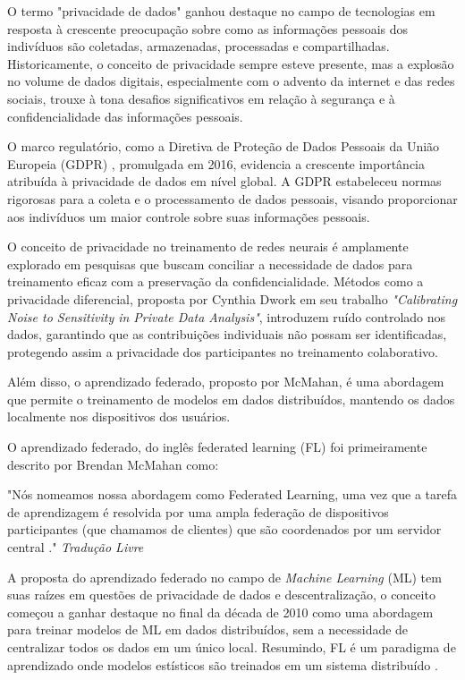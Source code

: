 O termo "privacidade de dados" ganhou destaque no campo de tecnologias em resposta à crescente preocupação sobre como as informações pessoais dos indivíduos são coletadas, armazenadas, processadas e compartilhadas. Historicamente, o conceito de privacidade sempre esteve presente, mas a explosão no volume de dados digitais, especialmente com o advento da internet e das redes sociais, trouxe à tona desafios significativos em relação à segurança e à confidencialidade das informações pessoais.

O marco regulatório, como a Diretiva de Proteção de Dados Pessoais da União Europeia (GDPR) \cite{GDPR}, promulgada em 2016, evidencia a crescente importância atribuída à privacidade de dados em nível global. A GDPR estabeleceu normas rigorosas para a coleta e o processamento de dados pessoais, visando proporcionar aos indivíduos um maior controle sobre suas informações pessoais.

O conceito de privacidade no treinamento de redes neurais é amplamente explorado em pesquisas que buscam conciliar a necessidade de dados para treinamento eficaz com a preservação da confidencialidade. Métodos como a privacidade diferencial, proposta por Cynthia Dwork em seu trabalho \textit{"Calibrating Noise to Sensitivity in Private Data Analysis"}\cite{dwork2006calibrating}, introduzem ruído controlado nos dados, garantindo que as contribuições individuais não possam ser identificadas, protegendo assim a privacidade dos participantes no treinamento colaborativo.

Além disso, o aprendizado federado, proposto por McMahan\cite{mcmahan2017communication}, é uma abordagem que permite o treinamento de modelos em dados distribuídos, mantendo os dados localmente nos dispositivos dos usuários.

O aprendizado federado, do inglês federated learning (FL) foi primeiramente descrito por Brendan McMahan como:

\begin{citacao}
"Nós nomeamos nossa abordagem como Federated Learning, uma vez que a tarefa de aprendizagem é resolvida por uma ampla federação de dispositivos participantes (que chamamos de clientes) que são coordenados por um servidor central \cite{mcmahan2017communication}." \emph{Tradução Livre} 
\end{citacao}

A proposta do aprendizado federado no campo de \emph{Machine Learning} (ML) tem suas raízes em questões de privacidade de dados e descentralização, o conceito começou a ganhar destaque no final da década de 2010 como uma abordagem para treinar modelos de ML em dados distribuídos, sem a necessidade de centralizar todos os dados em um único local. Resumindo, FL é um paradigma de aprendizado onde modelos estísticos são treinados em um sistema distribuído \cite{li2020preserving}.

